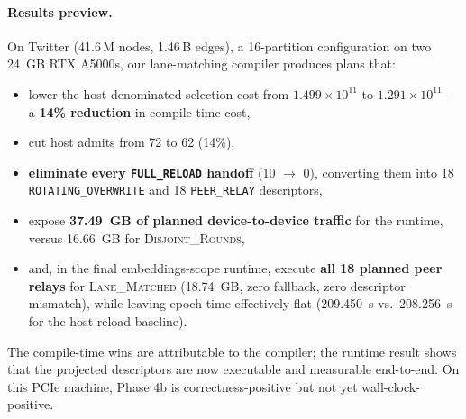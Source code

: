 \paragraph{Results preview.}
On Twitter (41.6\,M nodes, 1.46\,B edges), a 16-partition configuration
on two \SI{24}{GB} RTX A5000s, our lane-matching compiler produces
plans that:
\begin{itemize}
\item lower the host-denominated selection cost from
$1.499 \!\times\! 10^{11}$ to $1.291 \!\times\! 10^{11}$ -- a
\textbf{14\% reduction} in compile-time cost,
\item cut host admits from 72 to 62 (14\%),
\item \textbf{eliminate every \texttt{FULL\_RELOAD} handoff}
(10 $\rightarrow$ 0), converting them into 18
\texttt{ROTATING\_OVERWRITE} and 18 \texttt{PEER\_RELAY} descriptors,
\item expose \textbf{\SI{37.49}{GB} of planned device-to-device traffic}
for the runtime, versus \SI{16.66}{GB} for
\textsc{Disjoint\_Rounds},
\item and, in the final embeddings-scope runtime, execute
\textbf{all 18 planned peer relays} for \textsc{Lane\_Matched}
(\SI{18.74}{GB}, zero fallback, zero descriptor mismatch), while
leaving epoch time effectively flat
(\SI{209.450}{s} vs.\ \SI{208.256}{s} for the host-reload baseline).
\end{itemize}

The compile-time wins are attributable to the compiler; the runtime
result shows that the projected descriptors are now executable and
measurable end-to-end. On this PCIe machine, Phase 4b is
correctness-positive but not yet wall-clock-positive.

